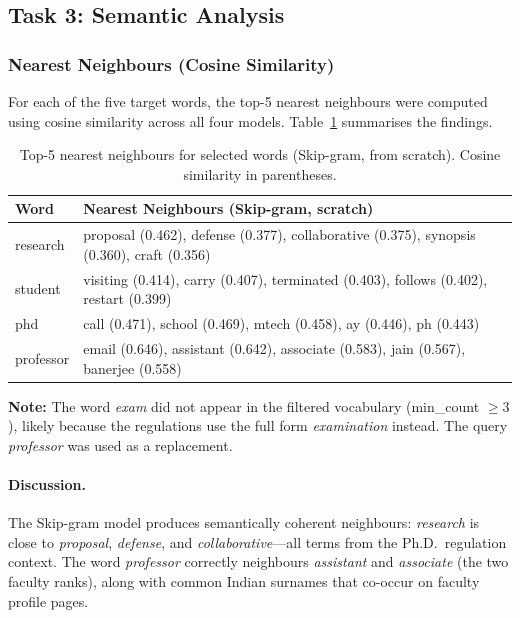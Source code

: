 \documentclass[12pt, a4paper]{article}
\begin{document}
\subsection{Task 3: Semantic Analysis}

\subsubsection{Nearest Neighbours (Cosine Similarity)}

For each of the five target words, the top-5 nearest neighbours were computed using cosine similarity across all four models. Table~\ref{tab:nn_results} summarises the findings.

\begin{table}[H]
\centering
\caption{Top-5 nearest neighbours for selected words (Skip-gram, from scratch). Cosine similarity in parentheses.}
\label{tab:nn_results}
\small
\begin{tabular}{p{1.5cm}p{11cm}}
\toprule
\textbf{Word} & \textbf{Nearest Neighbours (Skip-gram, scratch)} \\
\midrule
research  & proposal (0.462), defense (0.377), collaborative (0.375), synopsis (0.360), craft (0.356) \\
student   & visiting (0.414), carry (0.407), terminated (0.403), follows (0.402), restart (0.399) \\
phd       & call (0.471), school (0.469), mtech (0.458), ay (0.446), ph (0.443) \\
professor & email (0.646), assistant (0.642), associate (0.583), jain (0.567), banerjee (0.558) \\
\bottomrule
\end{tabular}
\end{table}

\textbf{Note:} The word \emph{exam} did not appear in the filtered vocabulary (min\_count $\geq 3$), likely because the regulations use the full form \emph{examination} instead. The query \emph{professor} was used as a replacement.

\paragraph{Discussion.} The Skip-gram model produces semantically coherent neighbours: \emph{research} is close to \emph{proposal}, \emph{defense}, and \emph{collaborative}---all terms from the Ph.D.\ regulation context. The word \emph{professor} correctly neighbours \emph{assistant} and \emph{associate} (the two faculty ranks), along with common Indian surnames that co-occur on faculty profile pages.
\end{document}
